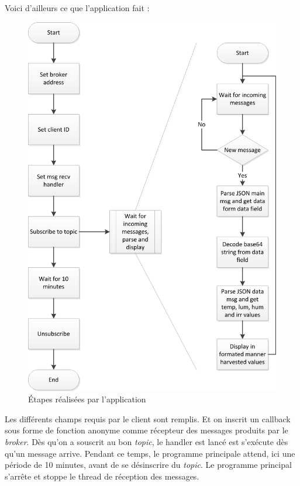 Voici d'ailleurs ce que l'application fait :
\begin{figure}[H]
	\begin{center}
		\includegraphics[width=12cm]{img/agro_app_flowchart.png}
		\caption{Étapes réalisées par l'application}
		\label{app_work_flow}
	\end{center}
\end{figure}

Les différents champs requis par le client sont remplis. Et on inscrit un callback sous forme de fonction anonyme comme récepteur des messages produits par le \textit{broker}. Dès qu'on a souscrit au bon \textit{topic}, le handler est lancé est s'exécute dès qu'un message arrive. Pendant ce temps, le programme principale attend, ici une période de 10 minutes, avant de se désinscrire du \textit{topic}. Le programme principal s'arrête et stoppe le thread de réception des messages.\\

